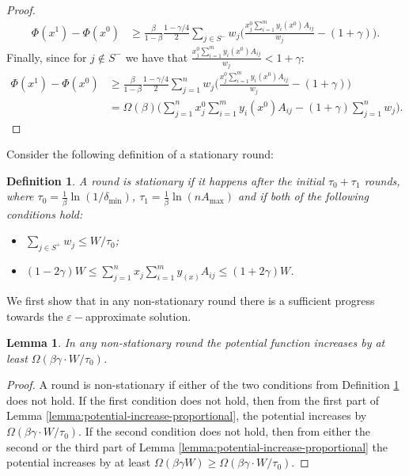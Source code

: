\documentclass[11pt]{article}
\newtheorem{lemma}[theorem]{Lemma}
\newtheorem{definition}[theorem]{Definition}
\begin{document}
\begin{proof}
\begin{align*}
\Phi(x^1) - \Phi(x^0) & \geq \frac{\beta}{1-\beta}\frac{1-\gamma/4}{2} \sum_{j\in S^-} w_j \Big(\frac{x_j^0 \sum_{i=1}^m y_i(x^0)A_{ij}}{w_j} - (1+\gamma)\Big). 
\end{align*}
Finally, since for $j\notin S^-$ we have that $\frac{x_j^0 \sum_{i=1}^m y_i(x^0)A_{ij}}{w_j}< 1 + \gamma$:
\begin{align*}
\Phi(x^1) - \Phi(x^0) & \geq \frac{\beta}{1-\beta}\frac{1-\gamma/4}{2} \sum_{j=1}^n w_j \Big(\frac{x_j^0 \sum_{i=1}^m y_i(x^0)A_{ij}}{w_j} - (1+\gamma)\Big)\\
&= \Omega(\beta) \Big( \sum_{j=1}^n x_j^0 \sum_{i=1}^m y_i(x^0)A_{ij} - (1+\gamma)\sum_{j=1}^n w_j \Big). 
\end{align*}
\end{proof}

Consider the following definition of a stationary round:

\begin{definition}\label{def:alpha=1-stat-round}
A round is stationary if it happens after the initial $\tau_0 + \tau_1$ rounds, where $\tau_0 = \frac{1}{\beta}\ln(1/\delta_{\min})$, $\tau_1 = \frac{1}{\beta}\ln(nA_{\max})$ and if both of the following conditions hold:
\begin{itemize}
\item $\sum_{j\in S^+}w_j \leq W /\tau_0$;
\item $(1-2\gamma)W\leq \sum_{j=1}^n x_j \sum_{i=1}^m y_(x)A_{ij}\leq (1+2\gamma)W$.
\end{itemize}
\end{definition}

We first show that in any non-stationary round there is a sufficient progress towards the $\varepsilon-$approximate solution.
\begin{lemma}\label{lemma:non-stat-round-alpha=1}
In any non-stationary round the potential function increases by at least $\Omega(\beta\gamma\cdot W/\tau_0)$.
\end{lemma}
\begin{proof}
A round is non-stationary if either of the two conditions from Definition \ref{def:alpha=1-stat-round} does not hold. If the first condition does not hold, then from the first part of Lemma \ref{lemma:potential-increase-proportional}, the potential increases by $\Omega(\beta\gamma\cdot W/\tau_0)$. If the second condition does not hold, then from either the second or the third part of Lemma \ref{lemma:potential-increase-proportional} the potential increases by at least $\Omega(\beta\gamma W) \geq \Omega(\beta\gamma\cdot W/\tau_0)$.
\end{proof}
\end{document}
